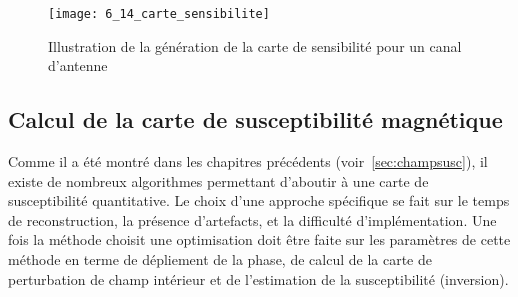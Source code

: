 {%
\begin{figure}[!b]
\centering
\texttt{[image: 6\_14\_carte\_sensibilite]}
\caption{Illustration de la génération de la carte de sensibilité pour un canal d’antenne}
\label{fig:6_14_carte_sensibilite}	
\end{figure}
\subsection{Calcul de la carte de susceptibilité magnétique}
\label{sec:calcsusc}
Comme il a été montré dans les chapitres précédents (voir~\ref{sec:champsusc}), il existe de nombreux
algorithmes permettant d’aboutir à une carte de susceptibilité quantitative. Le choix d’une approche spécifique se fait sur le temps de reconstruction, la présence d’artefacts, et la difficulté
d’implémentation. Une fois la méthode choisit une optimisation doit être faite sur les paramètres de
cette méthode en terme de dépliement de la phase, de calcul de la carte de perturbation de champ
intérieur et de l’estimation de la susceptibilité (inversion).

}
